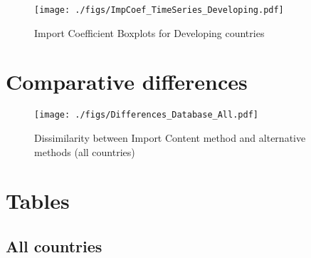 \documentclass[11pt]{article}
\begin{document}
\begin{figure}[H]
\centering
\texttt{[image: ./figs/ImpCoef\_TimeSeries\_Developing.pdf]}
\caption{Import Coefficient Boxplots for Developing countries}
\end{figure}
\section{Comparative differences}
\label{sec:org31b4373}


\newpage
\begin{figure}[H]
\centering
\texttt{[image: ./figs/Differences\_Database\_All.pdf]}
\caption{Dissimilarity between Import Content method and alternative methods (all countries)}
\end{figure}
\section{Tables}
\label{sec:orgbb39ffc}

\subsection{All countries}
\label{sec:org8e88ee2}


\end{document}
